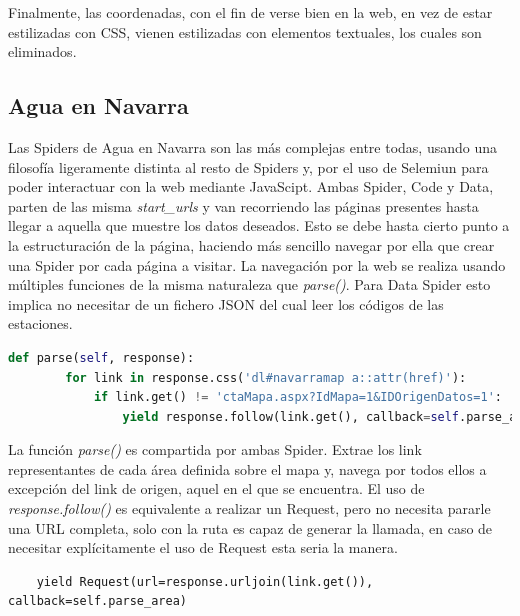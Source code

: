 Finalmente, las coordenadas, con el fin de verse bien en la web, en vez de estar estilizadas con CSS, vienen estilizadas con elementos textuales, los cuales son eliminados.

\subsection{Agua en Navarra}
Las Spiders de Agua en Navarra son las más complejas entre todas, usando una filosofía ligeramente distinta al resto de Spiders y, por el uso de Selemiun para poder interactuar con la web mediante JavaScipt.\newline
\newline
Ambas Spider, Code y Data, parten de las misma \textit{start\_urls} y van recorriendo las páginas presentes hasta llegar a aquella que muestre los datos deseados. Esto se debe hasta cierto punto a la estructuración de la página, haciendo más sencillo navegar por ella que crear una Spider por cada página a visitar. La navegación por la web se realiza usando múltiples funciones de la misma naturaleza que \textit{parse()}.\newline
\newline
Para Data Spider esto implica no necesitar de un fichero JSON del cual leer los códigos de las estaciones.\newline
\newline

\begin{lstlisting}[language=Python, caption={Función \textit{parse()} Agua en Navarra Spiders}]
	def parse(self, response):
		for link in response.css('dl#navarramap a::attr(href)'):
			if link.get() != 'ctaMapa.aspx?IdMapa=1&IDOrigenDatos=1':
				yield response.follow(link.get(), callback=self.parse_area)
\end{lstlisting}

La función \textit{parse()} es compartida por ambas Spider. Extrae los link representantes de cada área definida sobre el mapa y, navega por todos ellos a excepción del link de origen, aquel en el que se encuentra.\newline
\newline
El uso de \textit{response.follow()} es equivalente a realizar un Request, pero no necesita pararle una URL completa, solo con la ruta es capaz de generar la llamada, en caso de necesitar explícitamente el uso de Request esta seria la manera.

\begin{verbatim}
	yield Request(url=response.urljoin(link.get()), callback=self.parse_area)
\end{verbatim}

